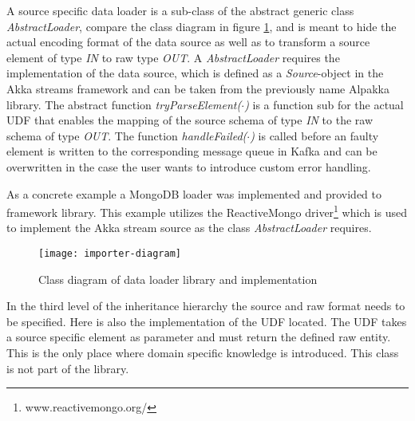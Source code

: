A source specific data loader is a sub-class of the abstract generic class \textit{AbstractLoader}, compare the class diagram in figure \ref{fig:importer-diagram}, and is meant to hide the actual encoding format of the data source as well as to transform a source element of type \textit{IN} to raw type \textit{OUT}. A \textit{AbstractLoader} requires the implementation of the data source, which is defined as a \textit{Source}-object in the Akka streams framework and can be taken from the previously name Alpakka library. The abstract function \textit{tryParseElement($\cdot$)} is a function sub for the actual UDF that enables the mapping of the source schema of type \textit{IN} to the raw schema of type \textit{OUT}. The function \textit{handleFailed($\cdot$)} is called before an faulty element is written to the corresponding message queue in Kafka and can be overwritten in the case the user wants to introduce custom error handling.

As a concrete example a MongoDB loader was implemented and provided to framework library. This example utilizes the ReactiveMongo driver\footnote{www.reactivemongo.org/} which is used to implement the Akka stream source as the class \textit{AbstractLoader} requires.

\begin{figure}[htb]
  \centering
  \texttt{[image: importer-diagram]}\\
  \caption{Class diagram of data loader library and implementation}
  \label{fig:importer-diagram}
\end{figure}

In the third level of the inheritance hierarchy the source and raw format needs to be specified. Here is also the implementation of the UDF located. The UDF takes a source specific element as parameter and must return the defined raw entity. This is the only place where domain specific knowledge is introduced. This class is not part of the library.

